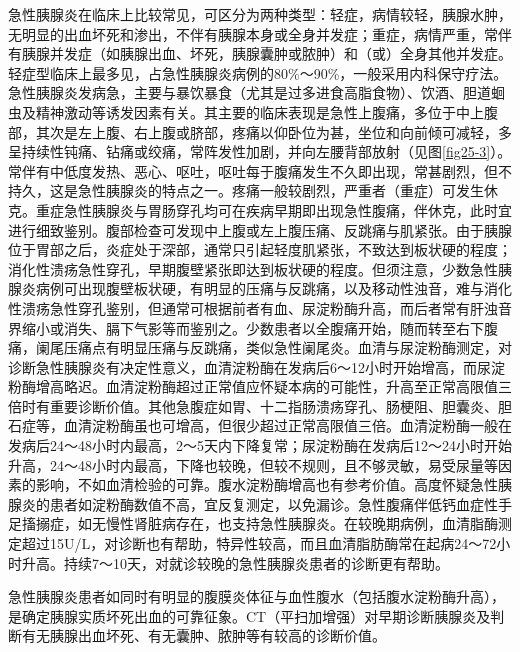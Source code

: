 急性胰腺炎在临床上比较常见，可区分为两种类型：轻症，病情较轻，胰腺水肿，无明显的出血坏死和渗出，不伴有胰腺本身或全身并发症；重症，病情严重，常伴有胰腺并发症（如胰腺出血、坏死，胰腺囊肿或脓肿）和（或）全身其他并发症。轻症型临床上最多见，占急性胰腺炎病例的80\%～90\%，一般采用内科保守疗法。急性胰腺炎发病急，主要与暴饮暴食（尤其是过多进食高脂食物）、饮酒、胆道蛔虫及精神激动等诱发因素有关。其主要的临床表现是急性上腹痛，多位于中上腹部，其次是左上腹、右上腹或脐部，疼痛以仰卧位为甚，坐位和向前倾可减轻，多呈持续性钝痛、钻痛或绞痛，常阵发性加剧，并向左腰背部放射（见图\ref{fig25-3}）。常伴有中低度发热、恶心、呕吐，呕吐每于腹痛发生不久即出现，常甚剧烈，但不持久，这是急性胰腺炎的特点之一。疼痛一般较剧烈，严重者（重症）可发生休克。重症急性胰腺炎与胃肠穿孔均可在疾病早期即出现急性腹痛，伴休克，此时宜进行细致鉴别。腹部检查可发现中上腹或左上腹压痛、反跳痛与肌紧张。由于胰腺位于胃部之后，炎症处于深部，通常只引起轻度肌紧张，不致达到板状硬的程度；消化性溃疡急性穿孔，早期腹壁紧张即达到板状硬的程度。但须注意，少数急性胰腺炎病例可出现腹壁板状硬，有明显的压痛与反跳痛，以及移动性浊音，难与消化性溃疡急性穿孔鉴别，但通常可根据前者有血、尿淀粉酶升高，而后者常有肝浊音界缩小或消失、膈下气影等而鉴别之。少数患者以全腹痛开始，随而转至右下腹痛，阑尾压痛点有明显压痛与反跳痛，类似急性阑尾炎。血清与尿淀粉酶测定，对诊断急性胰腺炎有决定性意义，血清淀粉酶在发病后6～12小时开始增高，而尿淀粉酶增高略迟。血清淀粉酶超过正常值应怀疑本病的可能性，升高至正常高限值三倍时有重要诊断价值。其他急腹症如胃、十二指肠溃疡穿孔、肠梗阻、胆囊炎、胆石症等，血清淀粉酶虽也可增高，但很少超过正常高限值三倍。血清淀粉酶一般在发病后24～48小时内最高，2～5天内下降复常；尿淀粉酶在发病后12～24小时开始升高，24～48小时内最高，下降也较晚，但较不规则，且不够灵敏，易受尿量等因素的影响，不如血清检验的可靠。腹水淀粉酶增高也有参考价值。高度怀疑急性胰腺炎的患者如淀粉酶数值不高，宜反复测定，以免漏诊。急性腹痛伴低钙血症性手足搐搦症，如无慢性肾脏病存在，也支持急性胰腺炎。在较晚期病例，血清脂酶测定超过15U/L，对诊断也有帮助，特异性较高，而且血清脂肪酶常在起病24～72小时升高。持续7～10天，对就诊较晚的急性胰腺炎患者的诊断更有帮助。

急性胰腺炎患者如同时有明显的腹膜炎体征与血性腹水（包括腹水淀粉酶升高），是确定胰腺实质坏死出血的可靠征象。CT（平扫加增强）对早期诊断胰腺炎及判断有无胰腺出血坏死、有无囊肿、脓肿等有较高的诊断价值。

